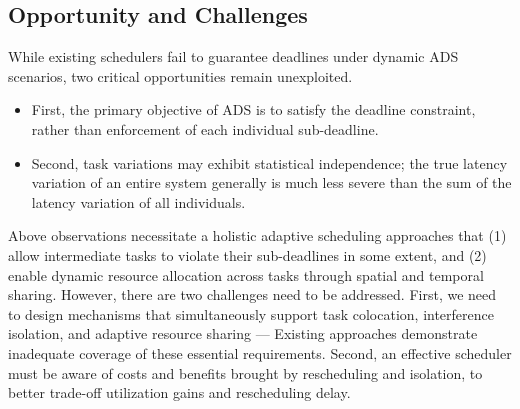 \subsection{Opportunity and Challenges} \label{subsec:opportunity}


While existing schedulers fail to guarantee \ETEs deadlines under dynamic ADS scenarios, two critical opportunities remain unexploited. 
\begin{itemize}[leftmargin=*, nosep]
  \item First, the primary objective of ADS is to satisfy the \ETEB deadline constraint, rather than enforcement of each individual \singlefunc sub-deadline. 
  \item Second, task variations may exhibit statistical independence; the true latency variation of an entire \ETEs system generally is much less severe than the sum of the latency variation of all individuals.   
\end{itemize}

Above observations necessitate a holistic adaptive scheduling approaches that (1) allow intermediate tasks to violate their sub-deadlines in some extent, and (2) enable dynamic resource allocation across tasks through spatial and temporal sharing. 
However, there are two challenges need to be addressed. First, we need to design mechanisms that simultaneously support task colocation, interference isolation, and adaptive resource sharing --- Existing approaches demonstrate inadequate coverage of these essential requirements. Second, an effective scheduler must be aware of costs and benefits brought by rescheduling and isolation, to better trade-off utilization gains and rescheduling delay.
